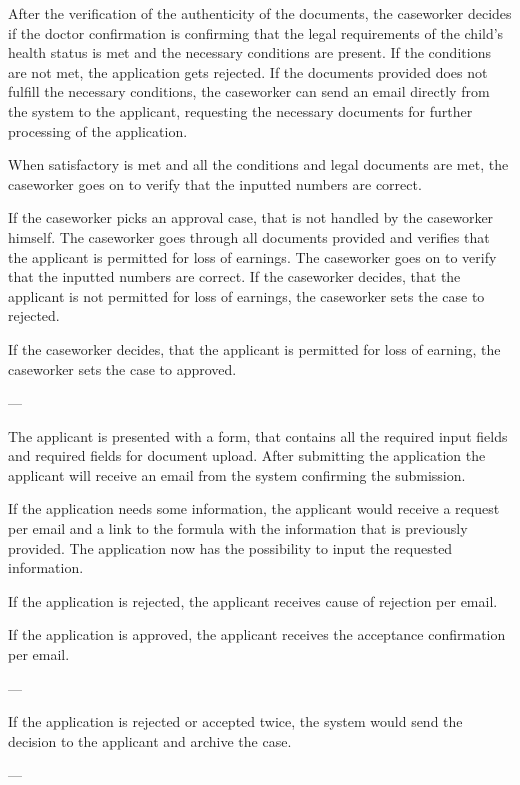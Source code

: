 After the verification of the authenticity of the documents, the caseworker decides if the doctor confirmation is confirming that the legal requirements of the child's health status is met and the necessary conditions are present. 
If the conditions are not met, the application gets rejected. 
If the documents provided does not fulfill the necessary conditions, the caseworker can send an email directly from the system to the applicant, requesting the necessary documents for further processing of the application.

When satisfactory is met and all the conditions and legal documents are met, the caseworker goes on to verify that the inputted numbers are correct.

If the caseworker picks an approval case, that is not handled by the caseworker himself. The caseworker goes through all documents provided and verifies that the applicant is permitted for loss of earnings. The caseworker goes on to verify that the inputted numbers are correct.
If the caseworker decides, that the applicant is not permitted for loss of earnings, the caseworker sets the case to rejected.

If the caseworker decides, that the applicant is permitted for loss of earning, the caseworker sets the case to approved.

---

The applicant is presented with a form, that contains all the required input fields and required fields for document upload. After submitting the application the applicant will receive an email from the system confirming the submission.

If the application needs some information, the applicant would receive a request per email and a link to the formula with the information that is previously provided. The application now has the possibility to input the requested information. 

If the application is rejected, the applicant receives cause of rejection per email.

If the application is approved, the applicant receives the acceptance confirmation per email. 

---

If the application is rejected or accepted twice, the system would send the decision to the applicant and archive the case. 

---

